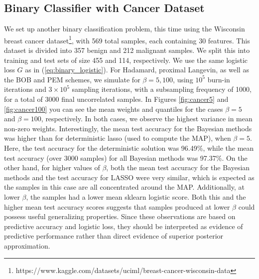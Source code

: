 \documentclass[11pt, twoside]{report}
\begin{document}
\subsection{Binary Classifier with Cancer Dataset}
We set up another binary classification problem, this time using the Wisconsin breast cancer dataset\footnote{https://www.kaggle.com/datasets/uciml/breast-cancer-wisconsin-data}, with 569 total samples, each containing 30 features. This dataset is divided into 357 benign and 212 malignant samples. We split this into training and test sets of size 455 and 114, respectively. We use the same logistic loss $G$ as in (\ref{eq:binary_logistic}). For Hadamard, proximal Langevin, as well as the BOB and PEM schemes, we simulate for $\beta = 5, 100$, using $10^5$ burn-in iterations and $3\times10^5$ sampling iterations, with a subsampling frequency of 1000, for a total of 3000 final uncorrelated samples. In Figures \ref{fig:cancer5} and \ref{fig:cancer100} you can see the mean weights and quantiles for the cases $\beta = 5$ and $\beta = 100$, respectively. In both cases, we observe the highest variance in mean non-zero weights. Interestingly, the mean test accuracy for the Bayesian methods was higher than for deterministic lasso (used to compute the MAP), when $\beta = 5$. Here, the test accuracy for the deterministic solution was 96.49\%, while the mean test accuracy (over 3000 samples) for all Bayesian methods was 97.37\%. On the other hand, for higher values of $\beta$, both the mean test accuracy for the Bayesian methods and the test accuracy for LASSO were very similar, which is expected as the samples in this case are all concentrated around the MAP. Additionally, at lower $\beta$, the samples had a lower mean sklearn logistic score. Both this and the higher mean test accuracy scores suggests that samples produced at lower $\beta$ could possess useful generalizing properties. Since these observations are based on predictive accuracy and logistic loss, they should be interpreted as evidence of predictive performance rather than direct evidence of superior posterior approximation.
\end{document}
